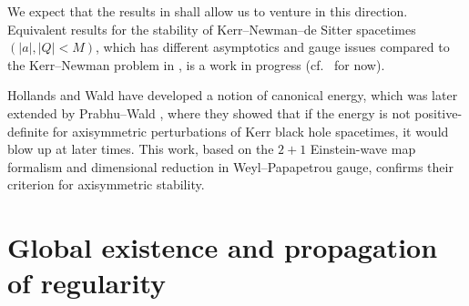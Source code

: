 \documentclass[11pt]{article}
\numberwithin{equation}{section}
\numberwithin{equation}{section}
\begin{document}
We expect that the results in \cite{GM17_gentitle} shall allow us to venture in this direction. Equivalent results for the stability of Kerr--Newman--de Sitter spacetimes $(\vert a \vert, \vert Q \vert<M)$, which has different asymptotics and gauge issues compared to the Kerr--Newman problem in \cite{GM17_gentitle}, is a work in progress (cf.\ \cite{NG_17_2, NG_17_1} for now).


Hollands and Wald \cite{WH_13} have developed a notion of canonical energy, which was later extended by Prabhu--Wald \cite{WP_13}, where they showed that if the energy is not positive-definite for axisymmetric perturbations of Kerr black hole spacetimes, it would blow up at later times.
This work, based on the $2+1$ Einstein-wave map formalism and dimensional reduction in Weyl--Papapetrou gauge, confirms their criterion for axisymmetric stability.

\section{Global existence and propagation of regularity}\label{section6}
\end{document}
